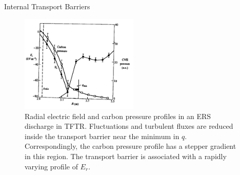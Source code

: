 \begin{frame} {Internal Transport Barriers}
    \begin{figure}
        \centering
        \includegraphics[width=0.5\textwidth]{figures/internal-transport-barrier.png}
        \caption{Radial electric field and carbon pressure profiles in an ERS discharge in TFTR. Fluctuations and turbulent fluxes are reduced inside the transport barrier near the minimum in $q$. Correspondingly, the carbon pressure profile has a stepper gradient in this region. The transport barrier is associated with a rapidly varying profile of $E_r$.}
        \label{fig:internal-transport-barrier}
    \end{figure}
\end{frame}
